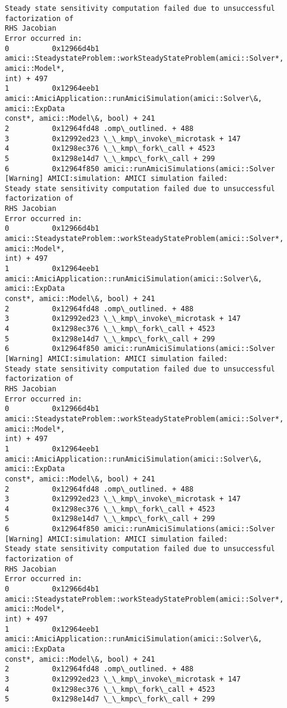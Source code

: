 \documentclass[11pt]{article}
\begin{document}
\begin{Verbatim}[commandchars=\\\{\}]
Steady state sensitivity computation failed due to unsuccessful factorization of
RHS Jacobian
Error occurred in:
0          0x12966d4b1
amici::SteadystateProblem::workSteadyStateProblem(amici::Solver*, amici::Model*,
int) + 497
1          0x12964eeb1
amici::AmiciApplication::runAmiciSimulation(amici::Solver\&, amici::ExpData
const*, amici::Model\&, bool) + 241
2          0x12964fd48 .omp\_outlined. + 488
3          0x12992ed23 \_\_kmp\_invoke\_microtask + 147
4          0x1298ec376 \_\_kmp\_fork\_call + 4523
5          0x1298e14d7 \_\_kmpc\_fork\_call + 299
6          0x12964f850 amici::runAmiciSimulations(amici::Solver
[Warning] AMICI:simulation: AMICI simulation failed:
Steady state sensitivity computation failed due to unsuccessful factorization of
RHS Jacobian
Error occurred in:
0          0x12966d4b1
amici::SteadystateProblem::workSteadyStateProblem(amici::Solver*, amici::Model*,
int) + 497
1          0x12964eeb1
amici::AmiciApplication::runAmiciSimulation(amici::Solver\&, amici::ExpData
const*, amici::Model\&, bool) + 241
2          0x12964fd48 .omp\_outlined. + 488
3          0x12992ed23 \_\_kmp\_invoke\_microtask + 147
4          0x1298ec376 \_\_kmp\_fork\_call + 4523
5          0x1298e14d7 \_\_kmpc\_fork\_call + 299
6          0x12964f850 amici::runAmiciSimulations(amici::Solver
[Warning] AMICI:simulation: AMICI simulation failed:
Steady state sensitivity computation failed due to unsuccessful factorization of
RHS Jacobian
Error occurred in:
0          0x12966d4b1
amici::SteadystateProblem::workSteadyStateProblem(amici::Solver*, amici::Model*,
int) + 497
1          0x12964eeb1
amici::AmiciApplication::runAmiciSimulation(amici::Solver\&, amici::ExpData
const*, amici::Model\&, bool) + 241
2          0x12964fd48 .omp\_outlined. + 488
3          0x12992ed23 \_\_kmp\_invoke\_microtask + 147
4          0x1298ec376 \_\_kmp\_fork\_call + 4523
5          0x1298e14d7 \_\_kmpc\_fork\_call + 299
6          0x12964f850 amici::runAmiciSimulations(amici::Solver
[Warning] AMICI:simulation: AMICI simulation failed:
Steady state sensitivity computation failed due to unsuccessful factorization of
RHS Jacobian
Error occurred in:
0          0x12966d4b1
amici::SteadystateProblem::workSteadyStateProblem(amici::Solver*, amici::Model*,
int) + 497
1          0x12964eeb1
amici::AmiciApplication::runAmiciSimulation(amici::Solver\&, amici::ExpData
const*, amici::Model\&, bool) + 241
2          0x12964fd48 .omp\_outlined. + 488
3          0x12992ed23 \_\_kmp\_invoke\_microtask + 147
4          0x1298ec376 \_\_kmp\_fork\_call + 4523
5          0x1298e14d7 \_\_kmpc\_fork\_call + 299

\end{Verbatim}
\end{document}
